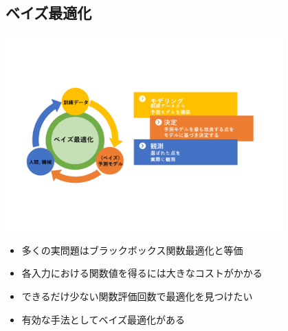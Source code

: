 \documentclass[dvipdfmx, 10.5pt]{beamer}
\begin{document}
\subsection{ベイズ最適化}
\begin{frame}{\insertsubsection}
	\begin{center}
		\includegraphics[width=0.80\textwidth]{./Fig/BO.pdf}
	\end{center}
	\begin{itemize}
		\item 多くの実問題はブラックボックス関数最適化と等価
		\item 各入力における関数値を得るには大きなコストがかかる
		\item できるだけ少ない関数評価回数で最適化を見つけたい
		\item 有効な手法として\alert{ベイズ最適化}がある
	\end{itemize}

\end{frame}

\end{document}

